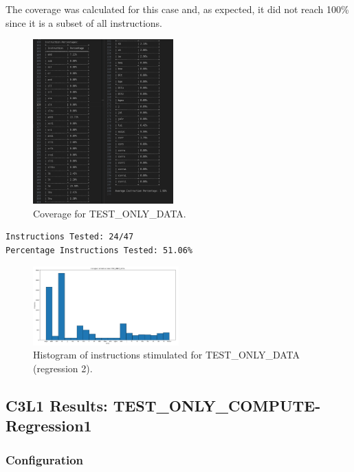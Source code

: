 The coverage was calculated for this case and, as expected, it did not reach 100\% since it is a subset of all instructions.

\begin{figure}[H]
    \centering
    \includegraphics[width=0.48\textwidth]{./c3l1_img/cov_t0.png}
    \caption{Coverage for TEST\_ONLY\_DATA.}
    \label{fig:cov_t0}
\end{figure}

\begin{verbatim}
Instructions Tested: 24/47
Percentage Instructions Tested: 51.06%
\end{verbatim}

\begin{figure}[H]
    \centering
    \includegraphics[width=0.5\textwidth]{./c3l1_img/tod_100.png}
    \caption{Histogram of instructions stimulated for TEST\_ONLY\_DATA (regression 2).}
    \label{fig:tod_100}
\end{figure}

\subsection{C3L1 Results: TEST\_ONLY\_COMPUTE-Regression1}

\subsubsection{Configuration}

